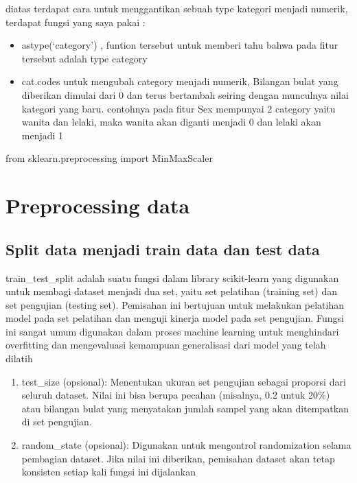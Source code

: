 \documentclass[
  letterpaper,
]{krantz}
\makeatletter
\newenvironment{Shaded}{\begin{snugshade}}{\end{snugshade}}
\newcommand{\ImportTok}[1]{\textcolor[rgb]{0.00,0.46,0.62}{#1}}
\newcommand{\NormalTok}[1]{\textcolor[rgb]{0.00,0.23,0.31}{#1}}
\newenvironment{kframe}{%
\medskip{}
\setlength{\fboxsep}{.8em}
 \def\at@end@of@kframe{}%
 \ifinner\ifhmode%
  \def\at@end@of@kframe{\end{minipage}}%
  \begin{minipage}{\columnwidth}%
 \fi\fi%
 \def\FrameCommand##1{\hskip\@totalleftmargin \hskip-\fboxsep
 \colorbox{shadecolor}{##1}\hskip-\fboxsep
     \hskip-\linewidth \hskip-\@totalleftmargin \hskip\columnwidth}%
 \MakeFramed {\advance\hsize-\width
   \@totalleftmargin\z@ \linewidth\hsize
   \@setminipage}}%
 {\par\unskip\endMakeFramed%
 \at@end@of@kframe}
\renewenvironment{Shaded}{\begin{kframe}}{\end{kframe}}
\makeatother
\begin{document}
diatas terdapat cara untuk menggantikan sebuah type kategori menjadi
numerik, terdapat fungsi yang saya pakai :

\begin{itemize}
\item
  astype(`category') , funtion tersebut untuk memberi tahu bahwa pada
  fitur tersebut adalah type category
\item
  cat.codes untuk mengubah category menjadi numerik, Bilangan bulat yang
  diberikan dimulai dari 0 dan terus bertambah seiring dengan munculnya
  nilai kategori yang baru. contohnya pada fitur Sex mempunyai 2
  category yaitu wanita dan lelaki, maka wanita akan diganti menjadi 0
  dan lelaki akan menjadi 1
\end{itemize}

\begin{Shaded}
\begin{Highlighting}[]

\ImportTok{from}\NormalTok{ sklearn.preprocessing }\ImportTok{import}\NormalTok{ MinMaxScaler}
\end{Highlighting}
\end{Shaded}


\hypertarget{preprocessing-data-1}{%
\chapter{Preprocessing data}\label{preprocessing-data-1}}

\hypertarget{split-data-menjadi-train-data-dan-test-data-1}{%
\section{Split data menjadi train data dan test
data}\label{split-data-menjadi-train-data-dan-test-data-1}}

train\_test\_split adalah suatu fungsi dalam library scikit-learn yang
digunakan untuk membagi dataset menjadi dua set, yaitu set pelatihan
(training set) dan set pengujian (testing set). Pemisahan ini bertujuan
untuk melakukan pelatihan model pada set pelatihan dan menguji kinerja
model pada set pengujian. Fungsi ini sangat umum digunakan dalam proses
machine learning untuk menghindari overfitting dan mengevaluasi
kemampuan generalisasi dari model yang telah dilatih

\begin{enumerate}
\def\labelenumi{\arabic{enumi}.}
\item
  test\_size (opsional): Menentukan ukuran set pengujian sebagai
  proporsi dari seluruh dataset. Nilai ini bisa berupa pecahan
  (misalnya, 0.2 untuk 20\%) atau bilangan bulat yang menyatakan jumlah
  sampel yang akan ditempatkan di set pengujian.
\item
  random\_state (opsional): Digunakan untuk mengontrol randomization
  selama pembagian dataset. Jika nilai ini diberikan, pemisahan dataset
  akan tetap konsisten setiap kali fungsi ini dijalankan
\end{enumerate}
\end{document}

